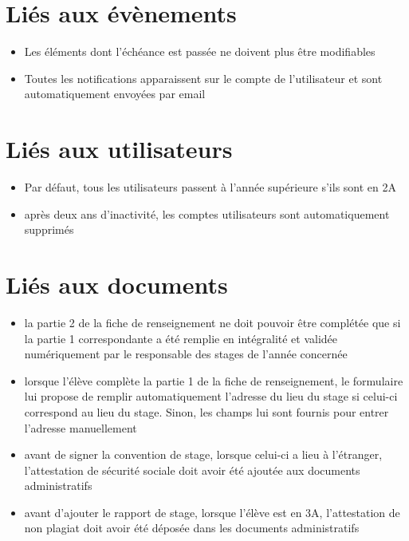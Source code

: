 \documentclass{scrreprt}
\begin{document}
\section{Li\'es aux \'ev\`enements}
\begin{itemize}
\item Les \'el\'ements dont l’\'ech\'eance est pass\'ee ne doivent plus \^etre modifiables
\item Toutes les notifications apparaissent sur le compte de l’utilisateur et sont automatiquement envoy\'ees par email
\end{itemize}

\section{Li\'es aux utilisateurs}
\begin{itemize}
\item Par d\'efaut, tous les utilisateurs passent \`a l’ann\'ee sup\'erieure s’ils sont en 2A
\item apr\`es deux ans d’inactivit\'e, les comptes utilisateurs sont automatiquement supprim\'es
\end{itemize}

\newpage
\section{Li\'es aux documents}
\begin{itemize}
\item la partie 2 de la fiche de renseignement ne doit pouvoir \^etre compl\'et\'ee que si la partie 1 correspondante a \'et\'e remplie en int\'egralit\'e et valid\'ee num\'eriquement par le responsable des stages de l’ann\'ee concern\'ee
\item lorsque l’\'el\`eve compl\`ete la partie 1 de la fiche de renseignement, le formulaire lui propose de remplir automatiquement l’adresse du lieu du stage si celui-ci correspond au lieu du stage. Sinon, les champs lui sont fournis pour entrer l’adresse manuellement
\item avant de signer la convention de stage, lorsque celui-ci a lieu à l’\'etranger, l’attestation de s\'ecurit\'e sociale doit avoir \'et\'e ajout\'ee aux documents administratifs
\item avant d’ajouter le rapport de stage, lorsque l’\'el\`eve est en 3A, l’attestation de non plagiat doit avoir \'et\'e d\'epos\'ee dans les documents administratifs
\end{itemize}
 
\end{document}
